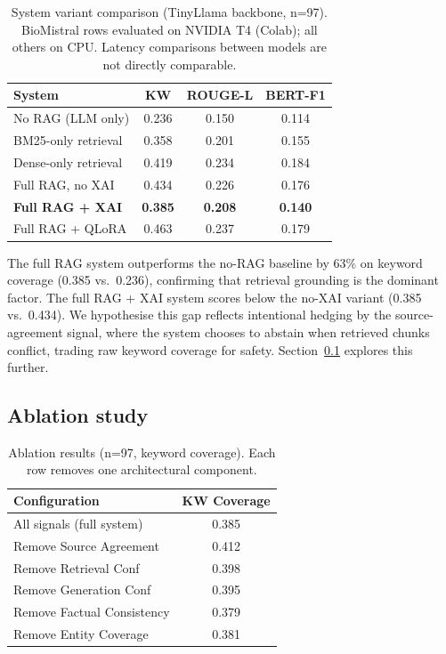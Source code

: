 \documentclass[conference,a4paper]{IEEEtran}
\begin{document}
\begin{table}[h]
\centering
\caption{System variant comparison (TinyLlama backbone, n=97).
         BioMistral rows evaluated on NVIDIA T4 (Colab); all others
         on CPU. Latency comparisons between models are not directly
         comparable.}
\label{tab:baselines}
\renewcommand{\arraystretch}{1.2}
\begin{tabular}{lccc}
\toprule
\textbf{System} & \textbf{KW} & \textbf{ROUGE-L} & \textbf{BERT-F1} \\
\midrule
No RAG (LLM only)         & 0.236 & 0.150 & 0.114 \\
BM25-only retrieval       & 0.358 & 0.201 & 0.155 \\
Dense-only retrieval      & 0.419 & 0.234 & 0.184 \\
Full RAG, no XAI          & 0.434 & 0.226 & 0.176 \\
\textbf{Full RAG + XAI}   & \textbf{0.385} & \textbf{0.208} & \textbf{0.140} \\
Full RAG + QLoRA          & 0.463 & 0.237 & 0.179 \\
\bottomrule
\end{tabular}
\end{table}


The full RAG system outperforms the no-RAG baseline by 63\% on keyword
coverage (0.385 vs.\ 0.236), confirming that retrieval grounding is
the dominant factor.
The full RAG + XAI system scores below the no-XAI variant (0.385
vs.\ 0.434). We hypothesise this gap reflects intentional hedging by
the source-agreement signal, where the system chooses to abstain
when retrieved chunks conflict, trading raw keyword coverage for safety.
Section~\ref{sec:ablation} explores this further.

\subsection{Ablation study}
\label{sec:ablation}

\begin{table}[h]
\centering
\caption{Ablation results (n=97, keyword coverage). Each row removes
         one architectural component.}
\label{tab:ablation}
\renewcommand{\arraystretch}{1.2}
\begin{tabular}{lc}
\toprule
\textbf{Configuration} & \textbf{KW Coverage} \\
\midrule
All signals (full system) & 0.385 \\
Remove Source Agreement & 0.412 \\
Remove Retrieval Conf & 0.398 \\
Remove Generation Conf & 0.395 \\
Remove Factual Consistency & 0.379 \\
Remove Entity Coverage & 0.381 \\
\bottomrule
\end{tabular}
\end{table}
\end{document}
